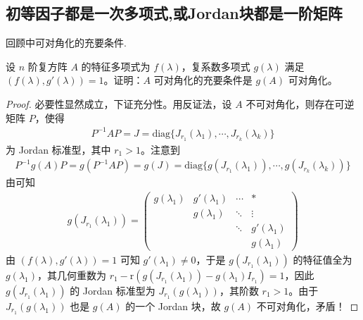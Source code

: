 \documentclass[../../main.tex]{subfiles}
\begin{document}
\subsection{初等因子都是一次多项式,或Jordan块都是一阶矩阵}

回顾中可对角化的充要条件.

\begin{proposition}\label{proposition:矩阵可对角化关于多项式的充要条件1}
设 $n$ 阶复方阵 $A$ 的特征多项式为 $f(\lambda)$，复系数多项式 $g(\lambda)$ 满足 $(f(\lambda),g'(\lambda)) = 1$。证明：$A$ 可对角化的充要条件是 $g(A)$ 可对角化。
\end{proposition}
\begin{proof}
必要性显然成立，下证充分性。用反证法，设 $A$ 不可对角化，则存在可逆矩阵 $P$，使得
\begin{align*}
P^{-1}AP = J = \mathrm{diag}\{J_{r_1}(\lambda_1),\cdots,J_{r_k}(\lambda_k)\}
\end{align*}
为 Jordan 标准型，其中 $r_1 > 1$。注意到
\begin{align*}
P^{-1}g(A)P = g(P^{-1}AP) = g(J) = \mathrm{diag}\{g(J_{r_1}(\lambda_1)),\cdots,g(J_{r_k}(\lambda_k))\}
\end{align*}
由可知   
\begin{align*}
g(J_{r_1}(\lambda_1))=\begin{pmatrix}
g(\lambda_1) & g'(\lambda_1) & \cdots & * \\
& g(\lambda_1) & \ddots & \vdots \\
& & \ddots & g'(\lambda_1) \\
& & & g(\lambda_1)
\end{pmatrix}
\end{align*}
由 $(f(\lambda),g'(\lambda)) = 1$ 可知 $g'(\lambda_1) \neq 0$，于是 $g(J_{r_1}(\lambda_1))$ 的特征值全为 $g(\lambda_1)$，其几何重数为 $r_1 - \mathrm{r}(g(J_{r_1}(\lambda_1)) - g(\lambda_1)I_{r_1}) = 1$，因此 $g(J_{r_1}(\lambda_1))$ 的 Jordan 标准型为 $J_{r_1}(g(\lambda_1))$，其阶数 $r_1 > 1$。由于 $J_{r_1}(g(\lambda_1))$ 也是 $g(A)$ 的一个 Jordan 块，故 $g(A)$ 不可对角化，矛盾！
\end{proof}
\end{document}

